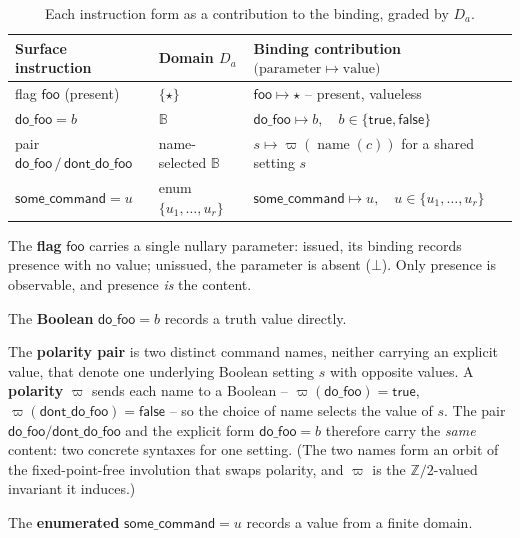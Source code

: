 \documentclass[11pt]{article}
\begin{document}
\begin{table}[h]
\centering
\footnotesize
\setlength{\tabcolsep}{6pt}
\renewcommand{\arraystretch}{1.35}
\begin{tabularx}{\textwidth}{@{}l l >{\raggedright\arraybackslash}X@{}}
\toprule
\textbf{Surface instruction} & \textbf{Domain \(D_a\)} &
\textbf{Binding contribution} \(\bigl(\text{parameter}\mapsto\text{value}\bigr)\)\\
\midrule
flag \(\mathsf{foo}\) (present) & \(\{\star\}\) &
\(\mathsf{foo}\mapsto\star\) \;-- present, valueless\\
\(\mathsf{do\_foo}=b\) & \(\mathbb{B}\) &
\(\mathsf{do\_foo}\mapsto b,\quad b\in\{\mathsf{true},\mathsf{false}\}\)\\
pair \(\mathsf{do\_foo}\,/\,\mathsf{dont\_do\_foo}\) & name-selected \(\mathbb{B}\) &
\(s\mapsto\varpi(\operatorname{name}(c))\) \;for a shared setting \(s\)\\
\(\mathsf{some\_command}=u\) & enum \(\{u_1,\dots,u_r\}\) &
\(\mathsf{some\_command}\mapsto u,\quad u\in\{u_1,\dots,u_r\}\)\\
\bottomrule
\end{tabularx}
\caption{Each instruction form as a contribution to the binding, graded by
\(D_a\).}
\end{table}

The \textbf{flag} \(\mathsf{foo}\) carries a single nullary parameter: issued, its
binding records presence with no value; unissued, the parameter is absent
(\(\bot\)). Only presence is observable, and presence \emph{is} the content.

The \textbf{Boolean} \(\mathsf{do\_foo}=b\) records a truth value directly.

The \textbf{polarity pair} is two distinct command names, neither carrying an
explicit value, that denote one underlying Boolean setting \(s\) with opposite
values. A \textbf{polarity} \(\varpi\) sends each name to a Boolean --
\(\varpi(\mathsf{do\_foo})=\mathsf{true}\),
\(\varpi(\mathsf{dont\_do\_foo})=\mathsf{false}\) -- so the choice of name selects
the value of \(s\). The pair \(\mathsf{do\_foo}/\mathsf{dont\_do\_foo}\) and the
explicit form \(\mathsf{do\_foo}=b\) therefore carry the \emph{same} content: two
concrete syntaxes for one setting. (The two names form an orbit of the
fixed-point-free involution that swaps polarity, and \(\varpi\) is the
\(\mathbb{Z}/2\)-valued invariant it induces.)

The \textbf{enumerated} \(\mathsf{some\_command}=u\) records a value from a finite
domain.
\end{document}
